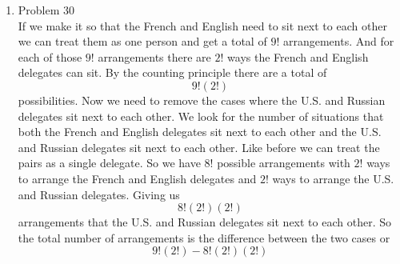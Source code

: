 \documentclass[11pt]{article}
\numberwithin{equation}{section}
\begin{document}
\begin{enumerate}
\item Problem 30\\
If we make it so that the French and English need to sit next to each other we can treat them as one person and get a total of $9!$ arrangements. And for each of those $9!$ arrangements there are $2!$ ways the French and English delegates can sit. By the counting principle there are a total of
$$9!(2!)$$
possibilities. Now we need to remove the cases where the U.S. and Russian delegates sit next to each other. We look for the number of situations that both the French and English delegates sit next to each other and the U.S. and Russian delegates sit next to each other. Like before we can treat the pairs as a single delegate. So we have $8!$ possible arrangements with $2!$ ways to arrange the French and English delegates and $2!$ ways to arrange the U.S. and Russian delegates. Giving us $$8!(2!)(2!)$$ arrangements that the U.S. and Russian delegates sit next to each other. So the total number of arrangements is the difference between the two cases or 
$$9!(2!) - 8!(2!)(2!)$$
\begin{center}
\end{center}
\end{enumerate}
\end{document}

